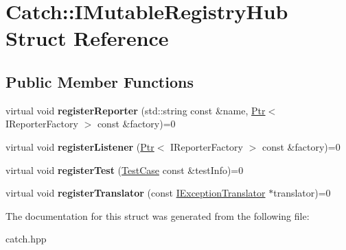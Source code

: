 \hypertarget{structCatch_1_1IMutableRegistryHub}{}\section{Catch\+:\+:I\+Mutable\+Registry\+Hub Struct Reference}
\label{structCatch_1_1IMutableRegistryHub}
\subsection*{Public Member Functions}
\begin{DoxyCompactItemize}
\item 
\mbox{\label{structCatch_1_1IMutableRegistryHub_aab72d0aa1fa14627f1a6a4c893ae0a12}} 
virtual void {\bfseries register\+Reporter} (std\+::string const \&name, \hyperlink{classCatch_1_1Ptr}{Ptr}$<$ I\+Reporter\+Factory $>$ const \&factory)=0
\item 
\mbox{\label{structCatch_1_1IMutableRegistryHub_ae06fcb90ba3f2b389d450cd81e229276}} 
virtual void {\bfseries register\+Listener} (\hyperlink{classCatch_1_1Ptr}{Ptr}$<$ I\+Reporter\+Factory $>$ const \&factory)=0
\item 
\mbox{\label{structCatch_1_1IMutableRegistryHub_a11b85c6744d88c9f83fe16ad4a8dd451}} 
virtual void {\bfseries register\+Test} (\hyperlink{classCatch_1_1TestCase}{Test\+Case} const \&test\+Info)=0
\item 
\mbox{\label{structCatch_1_1IMutableRegistryHub_ae6825365102693cf7707db022a2c2b49}} 
virtual void {\bfseries register\+Translator} (const \hyperlink{structCatch_1_1IExceptionTranslator}{I\+Exception\+Translator} $\ast$translator)=0
\end{DoxyCompactItemize}


The documentation for this struct was generated from the following file\+:\begin{DoxyCompactItemize}
\item 
catch.\+hpp\end{DoxyCompactItemize}
